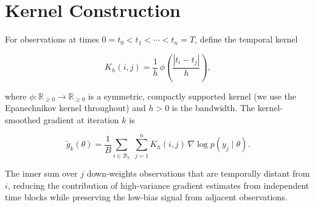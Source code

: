 \section{Kernel Construction}

For observations at times $0 = t_{0} < t_{1} < \cdots < t_{n} = T$, define the temporal kernel

\begin{equation}\label{eq:kernel}
K_{h}(i, j) = \frac{1}{h}\,\phi\!\left(\frac{|t_{i} - t_{j}|}{h}\right),
\end{equation}

\noindent where $\phi: \mathbb{R}_{\ge 0} \to \mathbb{R}_{\ge 0}$ is a symmetric, compactly supported kernel (we use the Epanechnikov kernel throughout) and $h > 0$ is the bandwidth. The kernel-smoothed gradient at iteration $k$ is

\begin{equation}\label{eq:kgrad}
\tilde{g}_{k}(\theta) = \frac{1}{B}\sum_{i \in \mathcal{B}_{k}}\;\sum_{j=1}^{n} K_{h}(i, j)\,\nabla\log p(y_{j}\mid\theta).
\end{equation}

The inner sum over $j$ down-weights observations that are temporally distant from $i$, reducing the contribution of high-variance gradient estimates from independent time blocks while preserving the low-bias signal from adjacent observations.
